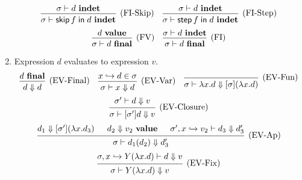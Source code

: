 \documentclass{article}
\newcommand{\evalsto}{\mathrel{\mathop{\Downarrow}}}
\newcommand{\hooksto}{\mathrel{\mathop{\hookrightarrow}}}
\newcommand{\entails}{\mathrel{\mathop{\vdash}}}
\newcommand{\final}{~\mathbf{final}}
\newcommand{\ival}{~\mathbf{value}}
\newcommand{\indet}{~\mathbf{indet}}
\DeclareMathOperator{\fskip}{\mathsf{skip}}
\DeclareMathOperator{\fstep}{\mathsf{step}}
\newcommand{\fin}{\mathrel{\mathop{\mathsf{in}}}}
\begin{document}
\begin{enumerate}
\[    \]
    \[
      \begin{prooftree}
        \hypo{\sigma \entails d \indet}
        \infer1[(FI-Skip)]{\sigma \entails \fskip f \fin d \indet}
      \end{prooftree}
      \quad
      \begin{prooftree}
        \hypo{\sigma \entails d \indet}
        \infer1[(FI-Step)]{\sigma \entails \fstep f \fin d \indet}
      \end{prooftree}
    \]
    \[
      \begin{prooftree}
        \hypo{d \ival}
        \infer1[(FV)]{\sigma \entails d \final}
      \end{prooftree}
      \quad
      \begin{prooftree}
        \hypo{\sigma \entails d \indet}
        \infer1[(FI)]{\sigma \entails d \final}
      \end{prooftree}
    \]
  \item \fbox{\(d \evalsto v\)} Expression \(d\) evaluates to expression \(v\).
    \[
      \begin{prooftree}
        \hypo{d \final}
        \infer1[(EV-Final)]{d \evalsto d}
      \end{prooftree}
      \quad
      \begin{prooftree}
        \hypo{x \hooksto d \in \sigma}
        \infer1[(EV-Var)]{\sigma \entails x \evalsto d}
      \end{prooftree}
      \quad
      \begin{prooftree}
        \infer0[(EV-Fun)]{\sigma \entails \lambda x . d \evalsto [\sigma] (\lambda x . d)}
      \end{prooftree}
    \]
    \[
      \begin{prooftree}
        \hypo{\sigma' \entails d \evalsto v}
        \infer1[(EV-Closure)]{\sigma \entails [\sigma'] d \evalsto v}
      \end{prooftree}
    \]
    \[
      \begin{prooftree}
        \hypo{d_1 \evalsto [\sigma'] (\lambda x . d_3)}
        \hypo{d_2 \evalsto v_2 \ival}
        \hypo{\sigma', x \hooksto v_2 \entails d_3 \evalsto d_3'}
        \infer3[(EV-Ap)]{\sigma \entails d_1 (d_2) \evalsto d_3'}
      \end{prooftree}
    \]
    \[
      \begin{prooftree}
        \hypo{\sigma, x \hooksto Y (\lambda x . d) \entails d \evalsto v}
        \infer1[(EV-Fix)]{\sigma \entails Y (\lambda x . d) \evalsto v}
      \end{prooftree}
\]
\end{enumerate}
\end{document}
